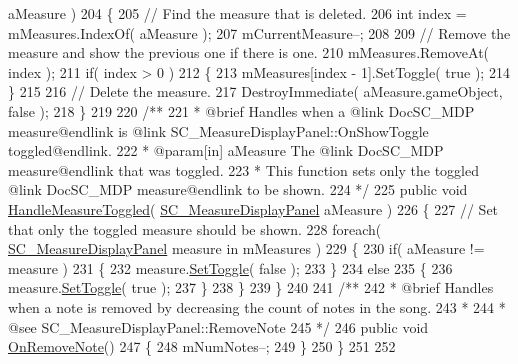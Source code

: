 \begin{DoxyCodeInclude}
      aMeasure )
204     \{
205         \textcolor{comment}{// Find the measure that is deleted.}
206         \textcolor{keywordtype}{int} index = mMeasures.IndexOf( aMeasure );
207         mCurrentMeasure--;
208 
209         \textcolor{comment}{// Remove the measure and show the previous one if there is one. }
210         mMeasures.RemoveAt( index );
211         \textcolor{keywordflow}{if}( index > 0 )
212         \{
213             mMeasures[index - 1].SetToggle( \textcolor{keyword}{true} );
214         \}
215 
216         \textcolor{comment}{// Delete the measure.}
217         DestroyImmediate( aMeasure.gameObject, \textcolor{keyword}{false} );
218     \}
219 \textcolor{comment}{}
220 \textcolor{comment}{    /**}
221 \textcolor{comment}{     * @brief Handles when a @link DocSC\_MDP measure@endlink is @link SC\_MeasureDisplayPanel::OnShowToggle
       toggled@endlink.}
222 \textcolor{comment}{     * @param[in] aMeasure The @link DocSC\_MDP measure@endlink that was toggled.}
223 \textcolor{comment}{     * This function sets only the toggled @link DocSC\_MDP measure@endlink to be shown.}
224 \textcolor{comment}{    */}
225     \textcolor{keyword}{public} \textcolor{keywordtype}{void} \hyperlink{group___s_c___n_d_c_handlers_ga458d57203645be514d3626211044b584}{HandleMeasureToggled}( \hyperlink{class_s_c___measure_display_panel}{SC\_MeasureDisplayPanel} 
      aMeasure )
226     \{
227         \textcolor{comment}{// Set that only the toggled measure should be shown.}
228         \textcolor{keywordflow}{foreach}( \hyperlink{class_s_c___measure_display_panel}{SC\_MeasureDisplayPanel} measure \textcolor{keywordflow}{in} mMeasures )
229         \{
230             \textcolor{keywordflow}{if}( aMeasure != measure )
231             \{
232                 measure.\hyperlink{group___s_c___m_d_p_pub_func_ga6512fa5010bcecd85f7e8542cea91310}{SetToggle}( \textcolor{keyword}{false} );
233             \}
234             \textcolor{keywordflow}{else}
235             \{
236                 measure.\hyperlink{group___s_c___m_d_p_pub_func_ga6512fa5010bcecd85f7e8542cea91310}{SetToggle}( \textcolor{keyword}{true} );
237             \}
238         \}
239     \}
240 \textcolor{comment}{}
241 \textcolor{comment}{    /**}
242 \textcolor{comment}{     * @brief Handles when a note is removed by decreasing the count of notes in the song.}
243 \textcolor{comment}{     * }
244 \textcolor{comment}{     * @see SC\_MeasureDisplayPanel::RemoveNote}
245 \textcolor{comment}{    */}
246     \textcolor{keyword}{public} \textcolor{keywordtype}{void} \hyperlink{group___s_c___n_d_c_handlers_ga6dbbf12e55681d13f43e489dd4a100dc}{OnRemoveNote}()
247     \{
248         mNumNotes--;
249     \}
250 \}
251  
252  
\end{DoxyCodeInclude}
 